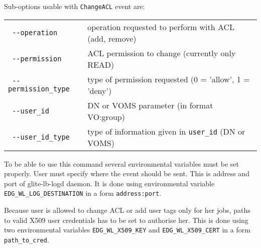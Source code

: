 \medskip

Sub-options usable with \verb'ChangeACL' event are:

\begin{tabularx}{\textwidth}{lX}
\texttt{      -{}-operation} &       operation requested to perform with ACL (add, remove)\\
\texttt{      -{}-permission} &      ACL permission to change (currently only READ)\\
\texttt{      -{}-permission\_type} & type of permission requested (0 = 'allow', 1 = 'deny')\\
\texttt{      -{}-user\_id} &         DN or VOMS parameter (in format VO:group)\\
\texttt{      -{}-user\_id\_type} &    type of information given in \verb'user_id' (DN or VOMS)\\
\end{tabularx}

\bigskip

To be able to use this command several environmental variables must be set
properly. User must specify where the event should be sent. This is address and
port of glite-lb-logd daemon. It is done using environmental variable
\verb'EDG_WL_LOG_DESTINATION' in a form \verb'address:port'.

Because user is allowed to change ACL or add user tags only for her jobs, paths
to valid X509 user credentials has to be set to authorise her. This is done
using two environmental variables \verb'EDG_WL_X509_KEY' and
\verb'EDG_WL_X509_CERT' in a form \verb'path_to_cred'.

